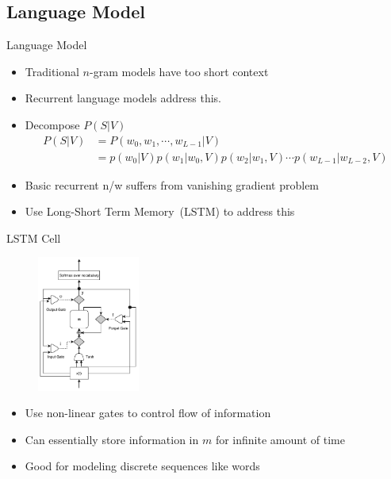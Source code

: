 \documentclass{beamer}
\begin{document}
\subsection{Language Model}
\begin{frame}{Language Model}
\begin{itemize}
\item Traditional $n$-gram models have too short context
\item Recurrent language models address this.
\item Decompose $P(S|V)$
    \begin{align*}
        \label{eq:langB2} 
        P(S|V) &= P(w_0, w_1, \cdots, w_{L-1}|V) \\
               &= p(w_0|V)p(w_1|w_0,V)p(w_2|w_1,V)\cdots p(w_{L-1}|w_{L-2},V)
    \end{align*}
\item Basic recurrent n/w suffers from vanishing gradient problem 
\item Use Long-Short Term Memory~(LSTM) to address this
\end{itemize} 
\end{frame}
\begin{frame}{LSTM Cell}
    \begin{figure}[h]
        \centering
        \includegraphics[width=0.3\textwidth]{images/LstmBlockDiag.pdf}
    \end{figure}
    \begin{itemize}
        \item Use non-linear gates to control flow of information
        \item Can essentially store information in $m$ for infinite amount of time 
        \item Good for modeling discrete sequences like words 
    \end{itemize}
\end{frame}
\end{document}

